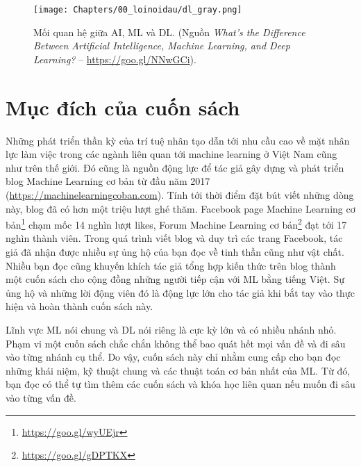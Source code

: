 \begin{figure}[]
\centering
\texttt{[image: Chapters/00\_loinoidau/dl\_gray.png]}
\caption[]{Mối quan hệ giữa AI, ML và DL. (Nguồn \textit{What’s the Difference Between Artificial
Intelligence, Machine Learning, and Deep Learning?} --
\url{https://goo.gl/NNwGCi}).}
\label{fig:0_1}
\end{figure}

\section{Mục đích của cuốn sách}
Những phát triển thần kỳ của trí tuệ nhân tạo dẫn tới nhu cầu cao về mặt nhân
lực làm việc trong các ngành liên quan tới machine learning ở Việt Nam cũng như
trên thế giới. Đó cũng là nguồn động lực để tác giả gây dựng và phát triển
blog Machine Learning cơ bản từ đầu năm 2017
(\url{https://machinelearningcoban.com}). Tính tới thời điểm đặt bút viết những
dòng này, blog đã có hơn một triệu lượt ghé thăm. Facebook page Machine Learning
cơ bản\footnote{\url{https://goo.gl/wyUEjr}} chạm mốc 14 nghìn lượt likes, Forum
Machine Learning cơ bản\footnote{\url{https://goo.gl/gDPTKX}} đạt tới 17 nghìn
thành viên. Trong quá trình viết blog và duy trì các trang Facebook, tác giả đã
nhận được nhiều sự ủng hộ của bạn đọc về tinh thần cũng như vật chất. Nhiều
bạn đọc cũng khuyến khích tác giả tổng hợp kiến thức trên blog thành một
cuốn sách cho cộng đồng những người tiếp cận với ML bằng tiếng
Việt. Sự ủng hộ và những lời động viên đó là động lực lớn cho tác giả khi bắt
tay vào thực hiện và hoàn thành cuốn sách này.


Lĩnh vực ML nói chung và DL nói riêng là cực kỳ lớn và có nhiều nhánh nhỏ. Phạm vi
một cuốn sách chắc chắn không thể bao quát hết mọi vấn đề và đi sâu vào từng
nhánh cụ thể. Do vậy, cuốn sách này chỉ nhằm cung cấp cho bạn đọc những
khái niệm, kỹ thuật chung và các thuật toán cơ bản nhất của ML. Từ đó, bạn đọc
có thể tự tìm thêm các cuốn sách và khóa học liên quan nếu muốn đi sâu vào từng
vấn đề.




